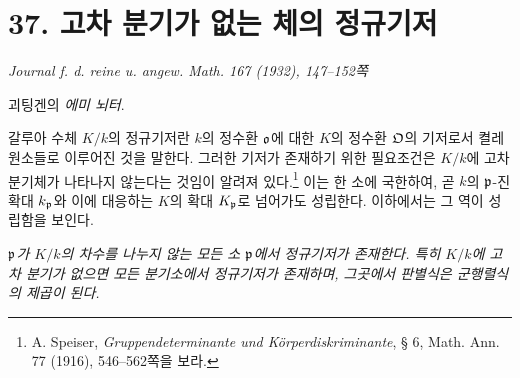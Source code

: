 
\section*{37. 고차 분기가 없는 체의 정규기저}

\begin{center}
\emph{Journal f. d. reine u. angew. Math. 167 (1932), 147--152쪽}
\end{center}

\begin{center}
괴팅겐의 \emph{에미 뇌터}.
\end{center}

갈루아 수체 \(K/k\)의 정규기저란 \(k\)의 정수환 \(\mathfrak o\)에 대한 \(K\)의 정수환 \(\mathfrak O\)의 기저로서 켤레원소들로 이루어진 것을 말한다. 그러한 기저가 존재하기 위한 필요조건은 \(K/k\)에 고차 분기체가 나타나지 않는다는 것임이 알려져 있다.\footnote{A. Speiser, \emph{Gruppendeterminante und Körperdiskriminante}, § 6, Math. Ann. 77 (1916), 546--562쪽을 보라.} 이는 한 소에 국한하여, 곧 \(k\)의 \(\mathfrak p\)-진 확대 \(k_\mathfrak p\)와 이에 대응하는 \(K\)의 확대 \(K_\mathfrak p\)로 넘어가도 성립한다. 이하에서는 그 역이 성립함을 보인다.

\emph{\(\mathfrak p\)가 \(K/k\)의 차수를 나누지 않는 모든 소 \(\mathfrak p\)에서 정규기저가 존재한다. 특히 \(K/k\)에 고차 분기가 없으면 모든 분기소에서 정규기저가 존재하며, 그곳에서 판별식은 군행렬식의 제곱이 된다.}

